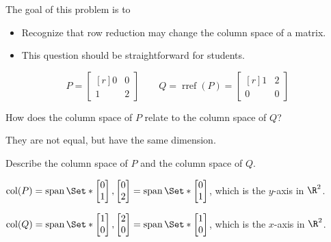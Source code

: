 \documentclass{problemset}
\DeclareMathOperator{\Span}{span}
\DeclareMathOperator{\Rref}{rref}
\DeclareMathOperator{\Col}{col}
\newcommand{\rref}{\Rref}
\newcommand{\mat}[1]{\begin{bmatrix*}[r]#1\end{bmatrix*}}
\begin{document}
	\question
	\begin{annotation}
		\begin{goals}

			The goal of this problem is to
			\begin{itemize}
				\item Recognize that row reduction may change the column space of a matrix.
			\end{itemize}
		\end{goals}

		\begin{notes}
			\begin{itemize}
				\item This question should be straightforward for students.
			\end{itemize}
		\end{notes}
	\end{annotation}
	\[
		P=\mat{0&0\\1&2}\qquad Q=\rref(P)=\mat{1&2\\0&0}
	\]
	\begin{parts}
		\item How does the column space of $P$ relate to the column space of $Q$?
			\begin{solution}
				They are not equal, but have the same dimension.
			\end{solution}
		\item Describe the column space of $P$ and the column space of $Q$.
			\begin{solution}
				$\Col(P)=\Span\Set*{\mat{0\\1},\mat{0\\2}}=\Span\Set*{\mat{0\\1}}$,
				which is the $y$-axis in $\R^2$.

				$\Col(Q)=\Span\Set*{\mat{1\\0},\mat{2\\0}}=\Span\Set*{\mat{1\\0}}$,
				which is the $x$-axis in $\R^2$.
			\end{solution}
	\end{parts}
\end{document}
